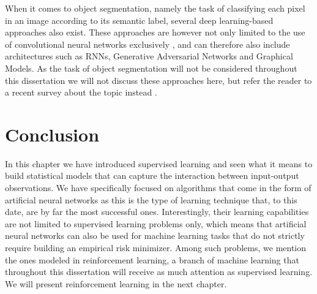When it comes to object segmentation, namely the task of classifying each pixel in an image according to its semantic label, several deep learning-based approaches also exist. These approaches are however not only limited to the use of convolutional neural networks exclusively \cite{minaee2021image}, and can therefore also include architectures such as RNNs, Generative Adversarial Networks and Graphical Models. As the task of object segmentation will not be considered throughout this dissertation we will not discuss these approaches here, but refer the reader to a recent survey about the topic instead \cite{minaee2021image}. 


\section{Conclusion}
\label{sec:conclusion01}
In this chapter we have introduced supervised learning and seen what it means to build statistical models that can capture the interaction between input-output observations. We have specifically focused on algorithms that come in the form of artificial neural networks as this is the type of learning technique that, to this date, are by far the most successful ones. Interestingly, their learning capabilities are not limited to supervised learning problems only, which means that artificial neural networks can also be used for machine learning tasks that do not strictly require building an empirical risk minimizer. Among such problems, we mention the ones modeled in reinforcement learning, a branch of machine learning that throughout this dissertation will receive as much attention as supervised learning. We will present reinforcement learning in the next chapter.
